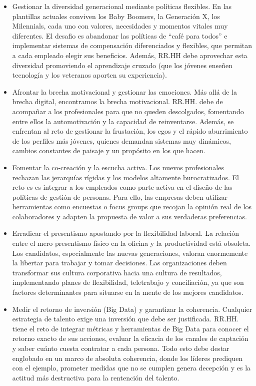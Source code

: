\documentclass[12pt]{book} %
\begin{document}
\begin{enumerate}
\begin{itemize}
        \item Gestionar la diversidad generacional mediante políticas flexibles. En las plantillas actuales conviven los Baby Boomers, la Generación X, los Milennials, cada uno con valores, necesidades y momentos vitales muy diferentes. El desafio es abandonar las políticas de ``café para todos'' e implementar sistemas de compensación diferenciados y flexibles, que permitan a cada empleado elegir sus beneficios. Además, RR.HH debe aprovechar esta diversidad promoviendo el aprendizaje cruzado (que los jóvenes enseñen tecnología y los veteranos aporten su experiencia).
        \item Afrontar la brecha motivacional y gestionar las emociones. Más allá de la brecha digital, encontramos la brecha motivacional. RR.HH. debe de acompañar a los profesionales para que no queden descolgados, fomentando entre ellos la automotivación y la capacidad de reinventarse. Además, se enfrentan al reto de gestionar la frustación, los egos y el rápido aburrimiento de los perfiles más jóvenes, quienes demandan sistemas muy dinámicos, cambios constantes de paisaje y un propósito en los que hacen.
        \item Fomentar la co-creación y la escucha activa. Los nuevos profesionales rechazan las jerarquías rígidas y los modelos altamente burocratizados. El reto es es integrar a los empleados como parte activa en el diseño de las políticas de gestión de personas. Para ello, las empresas deben utilizar herramientas como encuestas o focus groups que recojan la opinión real de los colaboradores y adapten la propuesta de valor a sus verdaderas preferencias.
        \item Erradicar el presentismo apostando por la flexibilidad laboral. La relación entre el mero presentismo físico en la oficina y la productividad está obsoleta. Los candidatos, especialmente las nuevas generaciones, valoran enormemente la libertar para trabajar y tomar decisiones. Las organizaciones deben transformar sus cultura corporativa hacia una cultura de resultados, implementando planes de flexibilidad, teletrabajo y conciliación, ya que son factores determinantes para situarse en la mente de los mejores candidatos.
        \item Medir el retorno de inversión (Big Data) y garantizar la coherencia. Cualquier estrategia de talento exige una inversión que debe ser justificada. RR.HH. tiene el reto de integrar métricas y herramientas de Big Data para conocer el retorno exacto de sus acciones, evaluar la eficacia de los canales de captación y saber cuánto cuesta contratar a cada persona. Todo esto debe destar englobado en un marco de absoluta coherencia, donde los líderes prediquen con el ejemplo, prometer medidas que no se cumplen genera decepción y es la actitud más destructiva para la rentención del talento.
    \end{itemize}
\end{enumerate}
\end{document}
